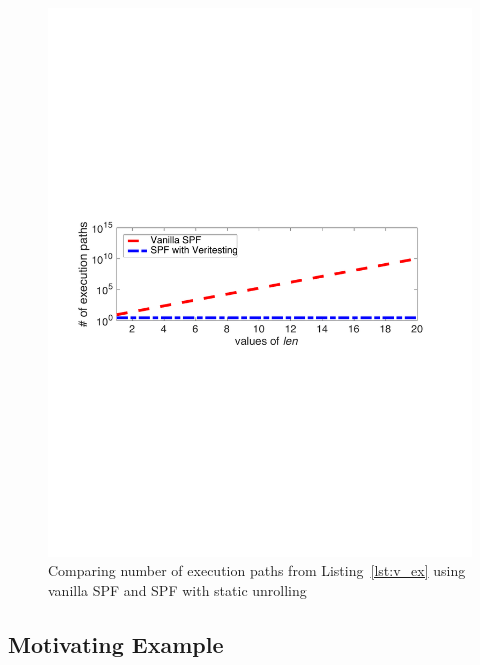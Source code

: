 %

%
\begin{figure}[]
\caption{Comparing number of execution paths from Listing~\ref{lst:v_ex} using vanilla SPF and SPF with static unrolling}
\label{fig:v_ex_plot}
\includegraphics[width=\columnwidth]{figures/veritesting_example_semilogy}
\end{figure}
%
\subsection{Motivating Example}
